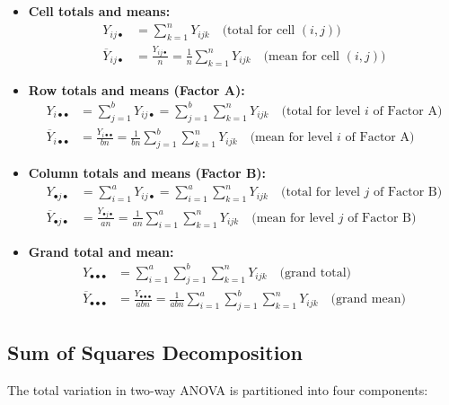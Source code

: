 \documentclass[twoside]{book}
\begin{document}
\begin{itemize}
\item \textbf{Cell totals and means:}
\begin{align*}
Y_{ij\bullet} &= \sum_{k=1}^n Y_{ijk} \quad \text{(total for cell $(i,j)$)} \\
\overline{Y}_{ij\bullet} &= \frac{Y_{ij\bullet}}{n} = \frac{1}{n}\sum_{k=1}^n Y_{ijk} \quad \text{(mean for cell $(i,j)$)}
\end{align*}

\item \textbf{Row totals and means (Factor A):}
\begin{align*}
Y_{i\bullet\bullet} &= \sum_{j=1}^b Y_{ij\bullet} = \sum_{j=1}^b \sum_{k=1}^n Y_{ijk} \quad \text{(total for level $i$ of Factor A)} \\
\overline{Y}_{i\bullet\bullet} &= \frac{Y_{i\bullet\bullet}}{bn} = \frac{1}{bn}\sum_{j=1}^b \sum_{k=1}^n Y_{ijk} \quad \text{(mean for level $i$ of Factor A)}
\end{align*}

\item \textbf{Column totals and means (Factor B):}
\begin{align*}
Y_{\bullet j\bullet} &= \sum_{i=1}^a Y_{ij\bullet} = \sum_{i=1}^a \sum_{k=1}^n Y_{ijk} \quad \text{(total for level $j$ of Factor B)} \\
\overline{Y}_{\bullet j\bullet} &= \frac{Y_{\bullet j\bullet}}{an} = \frac{1}{an}\sum_{i=1}^a \sum_{k=1}^n Y_{ijk} \quad \text{(mean for level $j$ of Factor B)}
\end{align*}

\item \textbf{Grand total and mean:}
\begin{align*}
Y_{\bullet\bullet\bullet} &= \sum_{i=1}^a \sum_{j=1}^b \sum_{k=1}^n Y_{ijk} \quad \text{(grand total)} \\
\overline{Y}_{\bullet\bullet\bullet} &= \frac{Y_{\bullet\bullet\bullet}}{abn} = \frac{1}{abn}\sum_{i=1}^a \sum_{j=1}^b \sum_{k=1}^n Y_{ijk} \quad \text{(grand mean)}
\end{align*}
\end{itemize}

\subsection{Sum of Squares Decomposition}

The total variation in two-way ANOVA is partitioned into four components:
\end{document}
